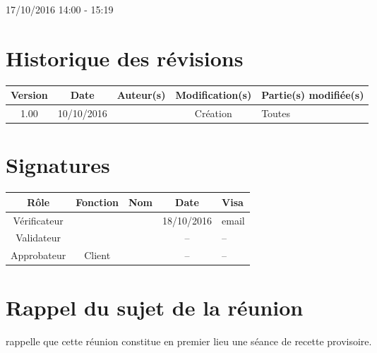 \documentclass [a4paper] {article}
\begin{document}
17/10/2016			 				%
\hfill   
\hfill 	 14:00 - 15:19 				%


\section*{Historique des révisions}
\begin{center}
			\begin{tabular}{| c | c | c | c | p{4cm} |}
				\hline
				\rowcolor{Gray}
				Version & Date & Auteur(s) & Modification(s) & Partie(s) modifiée(s)		 \\
				\hline
				1.00 & 10/10/2016 & \Kafui & Création & Toutes \\
		\hline		
			\end{tabular}
		\end{center}

\section*{Signatures}

		\begin{center}
			\begin{tabular}{| c | c | c | c | p{4cm} |}
				\hline
				\rowcolor{Gray}
				Rôle & Fonction & Nom & Date & Visa		 \\
				\hline
				Vérificateur & \RGC & \Melissa & 18/10/2016 & email \\[30pt]
				\hline
				Validateur & \CP & \Pierre & -- & -- \\[30pt]	
				\hline
				Approbateur & Client & \nomClient & -- & -- \\[30pt]	
				\hline
			\end{tabular}
		\end{center}


\section{Rappel du sujet de la réunion}
\Pierre{} rappelle que cette réunion constitue en premier lieu une séance de recette provisoire.
\end{document}

